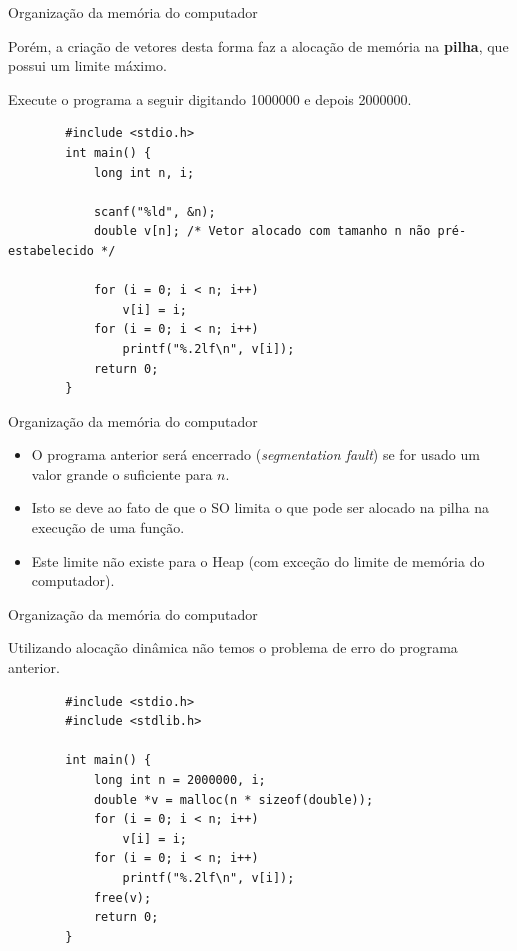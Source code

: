 \documentclass[handout]{beamer}
\begin{document}
\begin{frame}[fragile]{Organização da memória do computador}

    \small
    Porém, a criação de vetores desta forma faz a alocação de memória na \textbf{pilha}, que possui um limite máximo.

    Execute o programa a seguir digitando 1000000 e depois 2000000.
    \vspace{-0.3cm}
    \begin{verbatim}
        #include <stdio.h>
        int main() {
            long int n, i;

            scanf("%ld", &n);
            double v[n]; /* Vetor alocado com tamanho n não pré-estabelecido */

            for (i = 0; i < n; i++)
                v[i] = i;
            for (i = 0; i < n; i++) 
                printf("%.2lf\n", v[i]);
            return 0;
        }
     \end{verbatim}

\end{frame}

\begin{frame}[fragile]{Organização da memória do computador}

    \begin{itemize}
        \item O programa anterior será encerrado ({\it segmentation fault}) se for usado um valor grande o suficiente para $n$.
        \item Isto se deve ao fato de que o SO limita o que pode ser alocado na pilha na execução de uma função.
        \item Este limite não existe para o Heap (com exceção do limite de memória do computador).
    \end{itemize}

\end{frame}

\begin{frame}[fragile]{Organização da memória do computador}

    Utilizando alocação dinâmica não temos o problema de erro do programa anterior.
    \vspace{-0.3cm}

    \begin{verbatim}
        #include <stdio.h>
        #include <stdlib.h>
        
        int main() {
            long int n = 2000000, i;
            double *v = malloc(n * sizeof(double));
            for (i = 0; i < n; i++)
                v[i] = i;
            for (i = 0; i < n; i++)
                printf("%.2lf\n", v[i]);
            free(v);
            return 0;
        }
    \end{verbatim}

\end{frame}
\end{document}
